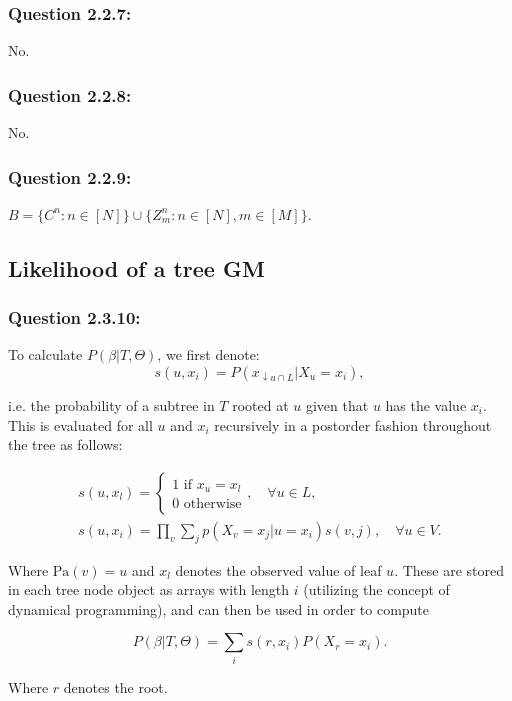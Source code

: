 \documentclass[a4paper]{article}
\begin{document}
\subsubsection*{Question 2.2.7:}
\noindent No.
\subsubsection*{Question 2.2.8:}
\noindent No.
\subsubsection*{Question 2.2.9:}
\noindent $B = \{C^n:n\in [N]\}\cup \{Z^n_m:n\in [N],m\in [M]\}$.
\subsection{Likelihood of a tree GM}
\subsubsection*{Question 2.3.10:}
To calculate $P(\beta\vert T,\Theta)$, we first denote:
\begin{equation}
s(u,x_i)=P(x_{\downarrow u\cap L}\vert X_u = x_i),
\end{equation}

\noindent i.e. the probability of a subtree in $T$ rooted at $u$ given that $u$ has the value $x_i$. This is evaluated for all $u$ and $x_i$ recursively in a postorder fashion throughout the tree as follows:


\begin{align}
s(u,x_l)=\begin{cases}
1 \text{ if } x_u = x_l\\
0 \text{ otherwise}
\end{cases},\quad \forall u\in L,\\ 
s(u,x_i)=\prod_{v}\sum_{j}p(X_v=x_j\vert u=x_i) s(v,j),\quad \forall u\in V.
\end{align}

\noindent Where $\text{Pa}(v)=u$ and $x_l$ denotes the observed value of leaf $u$. These are stored in each tree node object as arrays with length $i$ (utilizing the concept of dynamical programming), and can then be used in order to compute 

\begin{equation}
P(\beta\vert T,\Theta)=\sum_{i}s(r,x_i)P(X_r=x_i).
\end{equation}

\noindent Where $r$ denotes the root.
\end{document}

